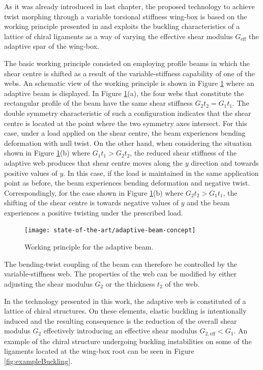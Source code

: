   As it was already introduced in last chapter, the proposed technology to achieve twist morphing through a variable torsional stiffness wing-box is based on the working principle presented in \cite{Raither2013a} and exploits the buckling characteristics of a lattice of chiral ligaments as a way of varying the effective shear modulus $G_{\mathrm{eff}}$ the adaptive spar of the wing-box.

  The basic working principle consisted on employing profile beams in which the shear centre is shifted as a result of the variable-stiffness capability of one of the webs. An schematic view of the working principle is shown in Figure \ref{fig:adaptive-beam-concept} where an adaptive beam is displayed. In Figure \ref{fig:adaptive-beam-concept}(a), the four webs that constitute the rectangular profile of the beam have the same shear stiffness $G_2 t_2 = G_1 t_1$. The double symmetry characteristic of such a configuration indicates that the shear centre is located at the point where the two symmetry axes intersect. For this case, under a load applied on the shear centre, the beam experiences bending deformation with null twist. On the other hand, when considering the situation shown in Figure \ref{fig:adaptive-beam-concept}(b) where $G_1 t_1 > G_2 t_2$, the reduced shear stiffness of the adaptive web produces that shear centre moves along the $y$ direction and towards positive values of $y$. In this case, if the load is maintained in the same application point as before, the beam experiences bending deformation and negative twist. Correspondingly, for the case shown in Figure \ref{fig:adaptive-beam-concept}(b) where $G_2 t_2 > G_1 t_1$, the shifting of the shear centre is towards negative values of $y$ and the beam experiences a positive twisting under the prescribed load.

  \begin{figure}[!htpb]
    \centering
    \texttt{[image: state-of-the-art/adaptive-beam-concept]}
    \caption[Working principle for the adaptive beam]{Working principle for the adaptive beam. \cite{Raither2013}}\label{fig:adaptive-beam-concept}
  \end{figure}

  The bending-twist coupling of the beam can therefore be controlled by the variable-stiffness web. The properties of the web can be modified by either adjusting the shear modulus $G_2$ or the thickness $t_2$ of the web. 

  In the technology presented in this work, the adaptive web is constituted of a lattice of chiral structures. On these elements, elastic buckling is intentionally induced and the resulting consequence is the reduction of the overall shear modulus $G_2$ effectively introducing an effective shear modulus $G_{2,\mathrm{eff}} < G_1$. An example of the chiral structure undergoing buckling instabilities on some of the ligaments located at the wing-box root can be seen in Figure \ref{fig:exampleBuckling}.

